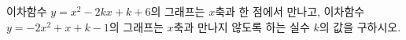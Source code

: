 이차함수 $y=x^2-2kx+k+6$의 그래프는 $x$축과 한 점에서 만나고, 이차함수 $y=-2x^2+x+k-1$의 그래프는 $x$축과 만나지 않도록 하는 실수 $k$의 값을 구하시오.

